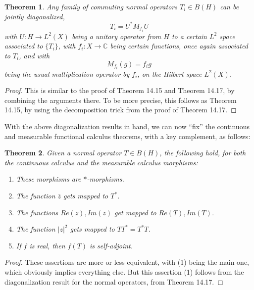 \documentclass[12pt]{amsbook}
\newtheorem{theorem}{Theorem}[chapter]
\begin{document}
\begin{theorem}
Any family of commuting normal operators $T_i\in B(H)$ can be jointly diagonalized,
$$T_i=U^*M_{f_i}U$$
with $U:H\to L^2(X)$ being a unitary operator from $H$ to a certain $L^2$ space associated to $\{T_i\}$, with $f_i:X\to\mathbb C$ being certain functions, once again associated to $T_i$, and with
$$M_{f_i}(g)=f_ig$$
being the usual multiplication operator by $f_i$, on the Hilbert space $L^2(X)$.
\end{theorem}

\begin{proof}
This is similar to the proof of Theorem 14.15 and Theorem 14.17, by combining the arguments there. To be more precise, this follows as Theorem 14.15, by using the decomposition trick from the proof of Theorem 14.17.
\end{proof}

With the above diagonalization results in hand, we can now ``fix'' the continuous and measurable functional calculus theorems, with a key complement, as follows:


\begin{theorem}
Given a normal operator $T\in B(H)$, the following hold, for both the continuous calculus and the measurable calculus morphisms:
\begin{enumerate}
\item These morphisms are $*$-morphisms.

\item The function $\bar{z}$ gets mapped to $T^*$.

\item The functions $Re(z),Im(z)$ get mapped to $Re(T),Im(T)$.

\item The function $|z|^2$ gets mapped to $TT^*=T^*T$.

\item If $f$ is real, then $f(T)$ is self-adjoint. 
\end{enumerate}
\end{theorem}

\begin{proof}
These assertions are more or less equivalent, with (1) being the main one, which obviously implies everything else. But this assertion (1) follows from the diagonalization result for the normal operators, from Theorem 14.17.
\end{proof}
\end{document}
